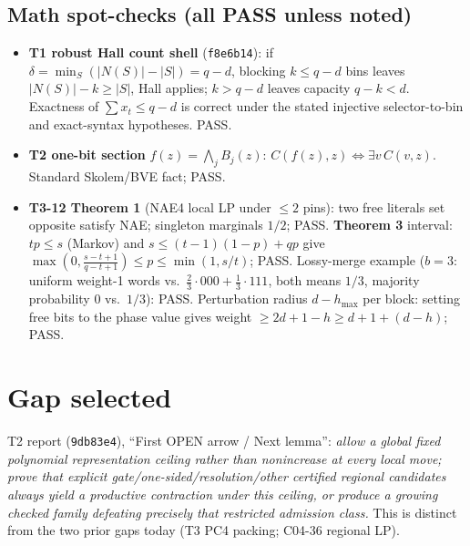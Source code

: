 \documentclass[11pt]{article}
\theoremstyle{definition}
\begin{document}
\subsection{Math spot-checks (all PASS unless noted)}
\begin{itemize}
\item \textbf{T1 robust Hall count shell} (\texttt{f8e6b14}): if $\delta=\min_S(|N(S)|-|S|)=q-d$, blocking
$k\le q-d$ bins leaves $|N(S)|-k\ge|S|$, Hall applies; $k>q-d$ leaves capacity $q-k<d$. Exactness of
$\sum x_t\le q-d$ is correct under the stated injective selector-to-bin and exact-syntax hypotheses. PASS.
\item \textbf{T2 one-bit section} $f(z)=\bigwedge_j B_j(z)$: $C(f(z),z)\iff\exists v\,C(v,z)$. Standard
Skolem/BVE fact; PASS.
\item \textbf{T3-12 Theorem 1} (NAE4 local LP under $\le2$ pins): two free literals set opposite satisfy NAE;
singleton marginals $1/2$; PASS. \textbf{Theorem 3} interval: $tp\le s$ (Markov) and
$s\le (t-1)(1-p)+qp$ give $\max(0,\frac{s-t+1}{q-t+1})\le p\le\min(1,s/t)$; PASS. Lossy-merge example
($b=3$: uniform weight-1 words vs.\ $\tfrac23\cdot000+\tfrac13\cdot111$, both means $1/3$, majority
probability $0$ vs.\ $1/3$): PASS. Perturbation radius $d-h_{\max}$ per block: setting free bits to the phase
value gives weight $\ge 2d+1-h\ge d+1+(d-h)$; PASS.
\end{itemize}

\section{Gap selected}
T2 report (\texttt{9db83e4}), ``First OPEN arrow / Next lemma'': \emph{allow a global fixed polynomial
representation ceiling rather than nonincrease at every local move; prove that explicit
gate/one-sided/resolution/other certified regional candidates always yield a productive contraction under this
ceiling, or produce a growing checked family defeating precisely that restricted admission class.}
This is distinct from the two prior gaps today (T3 PC4 packing; C04-36 regional LP).
\end{document}

